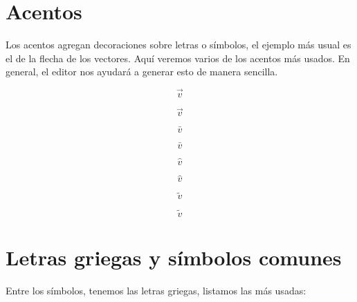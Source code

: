 \documentclass[graybox,envcountchap,sectrefs]{svmono}
\begin{document}
    \section{Acentos}
    Los acentos agregan decoraciones sobre letras o símbolos, el ejemplo más usual es el de la flecha de los vectores.
    Aquí veremos varios de los acentos más usados. En general, el editor nos ayudará a generar esto de manera sencilla.
    \begin{tcbraster}[raster columns=2, raster equal height]
    \begin{code}
        \[ \vec{v} \]
    \end{code}
    \begin{compiled}
        \[ \vec{v} \]
    \end{compiled}
    \end{tcbraster}


    \begin{tcbraster}[raster columns=2, raster equal height]
    \begin{code}
        \[ \bar{v} \]
    \end{code}
    \begin{compiled}
        \[ \bar{v} \]
    \end{compiled}
    \end{tcbraster}


    \begin{tcbraster}[raster columns=2, raster equal height]
    \begin{code}
        \[ \hat{v} \]
    \end{code}
    \begin{compiled}
        \[ \hat{v} \]
    \end{compiled}
    \end{tcbraster}

    \begin{tcbraster}[raster columns=2, raster equal height]
    \begin{code}
        \[ \tilde{v} \]
    \end{code}
    \begin{compiled}
        \[ \tilde{v} \]
    \end{compiled}

    \section{Letras griegas y símbolos comunes}
    \end{tcbraster}
    Entre los símbolos, tenemos las letras griegas, listamos las más usadas:
\end{document}
